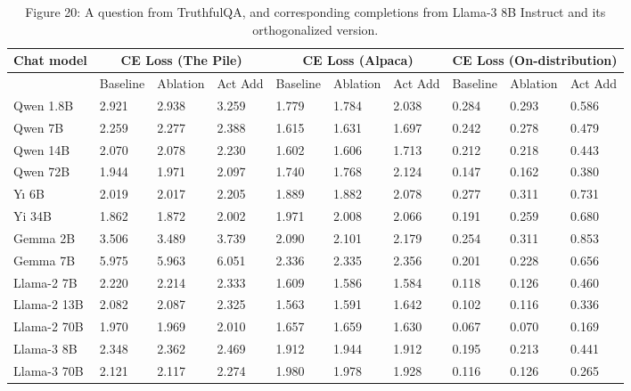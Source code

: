 \documentclass[10pt]{article}
\begin{document}
\begin{table}[h]
\begin{center}
\captionsetup{labelformat=empty}
\caption{Figure 20: A question from TruthfulQA, and corresponding completions from Llama-3 8B Instruct and its orthogonalized version.}
\begin{tabular}{|l|l|l|l|l|l|l|l|l|l|}
\hline
\multirow[b]{2}{*}{Chat model} & \multicolumn{3}{|c|}{CE Loss (The Pile)} & \multicolumn{3}{|c|}{CE Loss (Alpaca)} & \multicolumn{3}{|c|}{CE Loss (On-distribution)} \\
\hline
 & Baseline & Ablation & Act Add & Baseline & Ablation & Act Add & Baseline & Ablation & Act Add \\
\hline
Qwen 1.8B & 2.921 & 2.938 & 3.259 & 1.779 & 1.784 & 2.038 & 0.284 & 0.293 & 0.586 \\
\hline
Qwen 7B & 2.259 & 2.277 & 2.388 & 1.615 & 1.631 & 1.697 & 0.242 & 0.278 & 0.479 \\
\hline
Qwen 14B & 2.070 & 2.078 & 2.230 & 1.602 & 1.606 & 1.713 & 0.212 & 0.218 & 0.443 \\
\hline
Qwen 72B & 1.944 & 1.971 & 2.097 & 1.740 & 1.768 & 2.124 & 0.147 & 0.162 & 0.380 \\
\hline
Yı 6B & 2.019 & 2.017 & 2.205 & 1.889 & 1.882 & 2.078 & 0.277 & 0.311 & 0.731 \\
\hline
Yi 34B & 1.862 & 1.872 & 2.002 & 1.971 & 2.008 & 2.066 & 0.191 & 0.259 & 0.680 \\
\hline
Gemma 2B & 3.506 & 3.489 & 3.739 & 2.090 & 2.101 & 2.179 & 0.254 & 0.311 & 0.853 \\
\hline
Gemma 7B & 5.975 & 5.963 & 6.051 & 2.336 & 2.335 & 2.356 & 0.201 & 0.228 & 0.656 \\
\hline
Llama-2 7B & 2.220 & 2.214 & 2.333 & 1.609 & 1.586 & 1.584 & 0.118 & 0.126 & 0.460 \\
\hline
Llama-2 13B & 2.082 & 2.087 & 2.325 & 1.563 & 1.591 & 1.642 & 0.102 & 0.116 & 0.336 \\
\hline
Llama-2 70B & 1.970 & 1.969 & 2.010 & 1.657 & 1.659 & 1.630 & 0.067 & 0.070 & 0.169 \\
\hline
Llama-3 8B & 2.348 & 2.362 & 2.469 & 1.912 & 1.944 & 1.912 & 0.195 & 0.213 & 0.441 \\
\hline
Llama-3 70B & 2.121 & 2.117 & 2.274 & 1.980 & 1.978 & 1.928 & 0.116 & 0.126 & 0.265 \\
\hline
\end{tabular}
\end{center}
\end{table}
\end{document}
